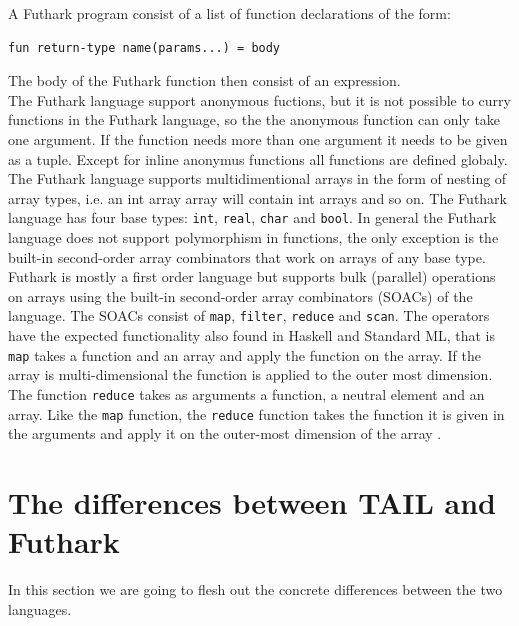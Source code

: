 \documentclass[11pt]{article}
\begin{document}
A Futhark program consist of a list of function declarations of the form:
\begin{lstlisting}[numbers=none,frame=none]
fun return-type name(params...) = body
\end{lstlisting}

The body of the Futhark function then consist of an expression.\\

The Futhark language support anonymous fuctions, but it is not possible to curry functions in the Futhark language,
so the the anonymous function can only take one argument.
If the function needs more than one argument it needs to be given as a tuple.
Except for inline anonymus functions all functions are defined globaly. \\

The Futhark language supports multidimentional arrays in the form of nesting of array types,
i.e. an int array array will contain int arrays and so on.
The Futhark language has four base types: {\tt int}, {\tt real}, {\tt char} and {\tt bool}.
In general the Futhark language does not support polymorphism in functions,
the only exception is the built-in second-order array combinators that work on arrays of any base type. \\

Futhark is mostly a first order language but supports bulk (parallel) operations on arrays
using the built-in second-order array combinators (SOACs) of the language. 
The SOACs consist of {\tt map}, {\tt filter}, {\tt reduce} and {\tt scan}.
The operators have the expected functionality also found in Haskell and Standard ML,
that is {\tt map} takes a function and an array and apply the function on the array.
If the array is multi-dimensional the function is applied to the outer most dimension.
The function {\tt reduce} takes as arguments a function, a neutral element and an array.
Like the {\tt map} function, the {\tt reduce} function takes the function it is given in the arguments
and apply it on the outer-most dimension of the array \cite{TroelsHenriksen}. \\ 



\section{The differences between TAIL and Futhark}
In this section we are going to flesh out the concrete differences between the two languages. 
\end{document}

